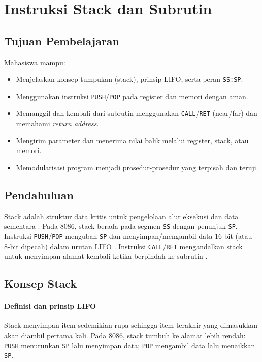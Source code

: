 \chapter{Instruksi Stack dan Subrutin}

\section{Tujuan Pembelajaran}
Mahasiswa mampu:
\begin{itemize}
    \item Menjelaskan konsep tumpukan (stack), prinsip LIFO, serta peran \texttt{SS:SP}.
    \item Menggunakan instruksi \texttt{PUSH}/\texttt{POP} pada register dan memori dengan aman.
    \item Memanggil dan kembali dari subrutin menggunakan \texttt{CALL}/\texttt{RET} (near/far) dan memahami \textit{return address}.
    \item Mengirim parameter dan menerima nilai balik melalui register, stack, atau memori.
    \item Memodularisasi program menjadi prosedur-prosedur yang terpisah dan teruji.
\end{itemize}

\section{Pendahuluan}
Stack adalah struktur data kritis untuk pengelolaan alur eksekusi dan data sementara \cite{susanto1995belajar}. Pada 8086, stack berada pada segmen \texttt{SS} dengan penunjuk \texttt{SP}. Instruksi \texttt{PUSH}/\texttt{POP} mengubah \texttt{SP} dan menyimpan/mengambil data 16-bit (atau 8-bit dipecah) dalam urutan LIFO \cite{hyde2010art}. Instruksi \texttt{CALL}/\texttt{RET} mengandalkan stack untuk menyimpan alamat kembali ketika berpindah ke subrutin \cite{nopi2003tutorial}.

\section{Konsep Stack}
\subsubsection{Definisi dan prinsip LIFO}
Stack menyimpan item sedemikian rupa sehingga item terakhir yang dimasukkan akan diambil pertama kali. Pada 8086, stack tumbuh ke alamat lebih rendah: \texttt{PUSH} menurunkan \texttt{SP} lalu menyimpan data; \texttt{POP} mengambil data lalu menaikkan \texttt{SP}.


